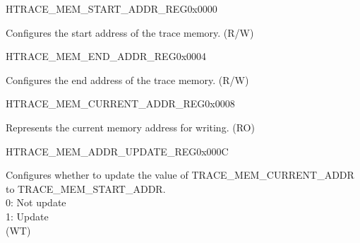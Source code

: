 \begin{register}{H}{TRACE\_MEM\_START\_ADDR\_REG}{0x0000}\label{regdesc:TRACEMEMSTARTADDRREG}
%
\regnewline%
\begin{regdesc}\begin{reglist}
\label{fielddesc:TRACEMEMSTARTADDR}\item [TRACE\_MEM\_START\_ADDR] Configures the start address of the trace memory. (R/W)
\end{reglist}\end{regdesc}
\end{register}


\begin{register}{H}{TRACE\_MEM\_END\_ADDR\_REG}{0x0004}\label{regdesc:TRACEMEMENDADDRREG}
%
\regnewline%
\begin{regdesc}\begin{reglist}
\label{fielddesc:TRACEMEMENDADDR}\item [TRACE\_MEM\_END\_ADDR] Configures the end address of the trace memory. (R/W)
\end{reglist}\end{regdesc}
\end{register}


\begin{register}{H}{TRACE\_MEM\_CURRENT\_ADDR\_REG}{0x0008}\label{regdesc:TRACEMEMCURRENTADDRREG}
%
\regnewline%
\begin{regdesc}\begin{reglist}
\label{fielddesc:TRACEMEMCURRENTADDR}\item [TRACE\_MEM\_CURRENT\_ADDR] Represents the current memory address for writing. (RO)
\end{reglist}\end{regdesc}
\end{register}


\begin{register}{H}{TRACE\_MEM\_ADDR\_UPDATE\_REG}{0x000C}\label{regdesc:TRACEMEMADDRUPDATEREG}
%
%
\regnewline%
\begin{regdesc}\begin{reglist}
\label{fielddesc:TRACEMEMCURRENTADDRUPDATE}\item [TRACE\_MEM\_CURRENT\_ADDR\_UPDATE] Configures whether to update the value of TRACE\_MEM\_CURRENT\_ADDR to TRACE\_MEM\_START\_ADDR.\\0: Not update\\1: Update\\ (WT)
\end{reglist}\end{regdesc}
\end{register}


